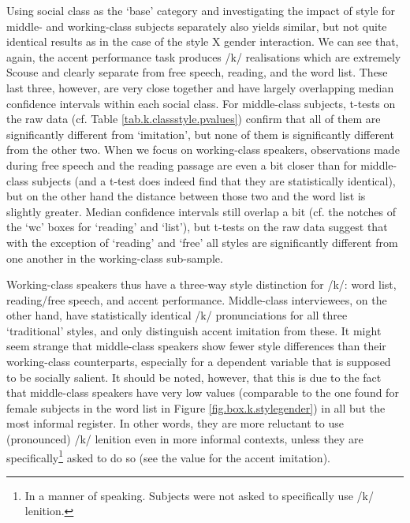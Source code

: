 Using social class as the `base' category and investigating the impact of style for middle- and working-class subjects separately also yields similar, but not quite identical results as in the case of the style X gender interaction.
We can see that, again, the accent performance task produces /k/ realisations which are extremely Scouse and clearly separate from free speech, reading, and the word list.
These last three, however, are very close together and have largely overlapping median confidence intervals within each social class.
For middle-class subjects, t-tests on the raw data (cf. Table \ref{tab.k.classstyle.pvalues}) confirm that all of them are significantly different from `imitation', but none of them is significantly different from the other two.
When we focus on working-class speakers, observations made during free speech and the reading passage are even a bit closer than for middle-class subjects (and a t-test does indeed find that they are statistically identical), but on the other hand the distance between those two and the word list is slightly greater.
Median confidence intervals still overlap a bit (cf. the notches of the `wc' boxes for `reading' and `list'), but t-tests on the raw data suggest that with the exception of `reading' and `free' all styles are significantly different from one another in the working-class sub-sample.

Working-class speakers thus have a three-way style distinction for /k/: word list, reading/free speech, and accent performance.
Middle-class interviewees, on the other hand, have statistically identical /k/ pronunciations for all three `traditional' styles, and only distinguish accent imitation from these.
It might seem strange that middle-class speakers show fewer style differences than their working-class counterparts, especially for a dependent variable that is supposed to be socially salient.
It should be noted, however, that this is due to the fact that middle-class speakers have very low  values (comparable to the one found for female subjects in the word list in Figure \ref{fig.box.k.stylegender}) in all but the most informal register.
In other words, they are more reluctant to use (pronounced) /k/ lenition even in more informal contexts, unless they are specifically\footnote{In a manner of speaking. Subjects were not asked to specifically use /k/ lenition.} asked to do so (see the value for the accent imitation).

